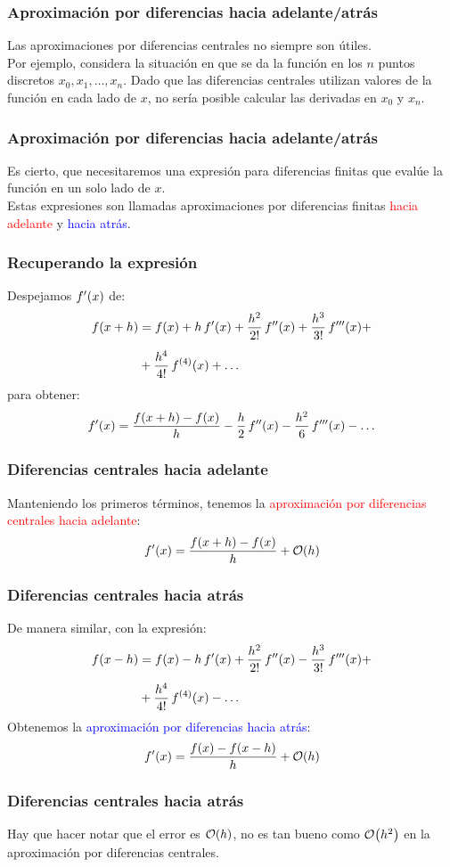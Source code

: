 \documentclass[12pt]{beamer}
\begin{document}
\begin{frame}
\frametitle{Aproximación por diferencias hacia adelante/atrás}
Las aproximaciones por diferencias centrales no siempre son útiles.
\\
\bigskip
\pause
Por ejemplo, considera la situación en que se da la función en los $n$ puntos discretos $x_{0}, x_{1}, \ldots,x_{n}$. \pause Dado que las diferencias centrales utilizan valores de la función en cada lado de $x$, no sería posible calcular las derivadas en $x_{0}$ y $x_{n}$.
\end{frame}
\begin{frame}
\frametitle{Aproximación por diferencias hacia adelante/atrás}
Es cierto, que necesitaremos una expresión para diferencias finitas que evalúe la función en un solo lado de $x$.
\\
\bigskip
\pause
Estas expresiones son llamadas aproximaciones por diferencias finitas \textcolor{red}{hacia adelante} y \textcolor{blue}{hacia atrás}.
\end{frame}
\begin{frame}
\frametitle{Recuperando la expresión}
Despejamos ${f}^{\prime} (x)$ de:
\pause
\begin{align*}
f (x + h) &= f(x) + h \, {f}^{\prime} (x) + \dfrac{h^{2}}{2!} \, {f}^{\prime \prime} (x) + \dfrac{h^{3}}{3!} \, {f}^{\prime \prime \prime} (x) + \\[0.5em]
&+ \dfrac{h^{4}}{4!} \, f^{(4)} (x) + \ldots
\end{align*}
\pause
para obtener:
\pause
\begin{align*}
{f}^{\prime} (x) = \dfrac{f (x + h) - f (x)}{h} - \dfrac{h}{2} \, {f}^{\prime \prime} (x) - \dfrac{h^{2}}{6} \, {f}^{\prime \prime \prime} (x) - \ldots
\end{align*}
\end{frame}
\begin{frame}
\frametitle{Diferencias centrales hacia adelante}
Manteniendo los primeros términos, tenemos la \textcolor{red}{aproximación por diferencias centrales hacia adelante}:
\pause
\begin{align*}
\pderivada{f} (x) = \dfrac{f (x + h) - f (x)}{h} + \order{h}
\end{align*}
\end{frame}
\begin{frame}
\frametitle{Diferencias centrales hacia atrás}
De manera similar, con la expresión:
\begin{align*}
f (x - h) &= f(x) - h \, {f}^{\prime} (x) + \dfrac{h^{2}}{2!} \, {f}^{\prime \prime} (x) - \dfrac{h^{3}}{3!} \, {f}^{\prime \prime \prime} (x) + \\[0.5em]
&+ \dfrac{h^{4}}{4!} \, f^{(4)}(x) - \ldots
\end{align*}
\pause
Obtenemos la \textcolor{blue}{aproximación por diferencias hacia atrás}:
\pause
\begin{align*}
\pderivada{f} (x) = \dfrac{f (x) - f(x - h)}{h} + \order{h}
\end{align*}
\end{frame}
\begin{frame}
\frametitle{Diferencias centrales hacia atrás}
Hay que hacer notar que el error es $\order{h}$, no es tan bueno como $\order{h^{2}}$ en la aproximación por diferencias centrales.
\end{frame}
\end{document}
